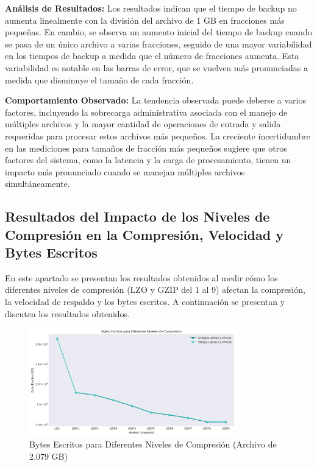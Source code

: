 \textbf{Análisis de Resultados:}
Los resultados indican que el tiempo de backup no aumenta linealmente con la división del archivo de 1 GB en fracciones más pequeñas. En cambio, se observa un aumento inicial del tiempo de backup cuando se pasa de un único archivo a varias fracciones, seguido de una mayor variabilidad en los tiempos de backup a medida que el número de fracciones aumenta. Esta variabilidad es notable en las barras de error, que se vuelven más pronunciadas a medida que disminuye el tamaño de cada fracción.

\textbf{Comportamiento Observado:}
La tendencia observada puede deberse a varios factores, incluyendo la sobrecarga administrativa asociada con el manejo de múltiples archivos y la mayor cantidad de operaciones de entrada y salida requeridas para procesar estos archivos más pequeños. La creciente incertidumbre en las mediciones para tamaños de fracción más pequeños sugiere que otros factores del sistema, como la latencia y la carga de procesamiento, tienen un impacto más pronunciado cuando se manejan múltiples archivos simultáneamente.



\subsection{Resultados del Impacto de los Niveles de Compresión en la Compresión, Velocidad y Bytes Escritos}

En este apartado se presentan los resultados obtenidos al medir cómo los diferentes niveles de compresión (LZO y GZIP del 1 al 9) afectan la compresión, la velocidad de respaldo y los bytes escritos. A continuación se presentan y discuten los resultados obtenidos.

\begin{figure}[H]
    \centering
    \includegraphics[width=0.8\textwidth]{bytes_escritos_archivo_grande.png}
    \caption{Bytes Escritos para Diferentes Niveles de Compresión (Archivo de 2.079 GB)}
    \label{fig:bytes_escritos_grande}
\end{figure}

